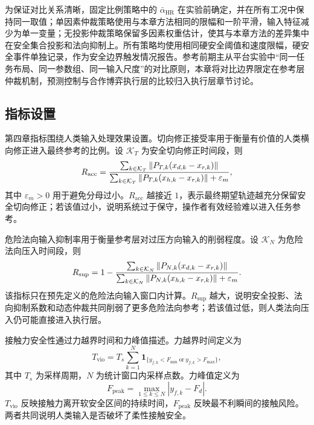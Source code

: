 为保证对比关系清晰，固定比例策略中的 $\bar\alpha_{\mathrm{HR}}$ 在实验前确定，并在所有工况中保持同一取值；单因素仲裁策略使用与本章方法相同的限幅和一阶平滑，输入特征减少为单一变量；无投影仲裁策略保留多因素权重估计，使其与本章方法的差异集中在安全集合投影和法向抑制上。所有策略均使用相同硬安全阈值和速度限幅，硬安全事件单独记录，作为安全边界触发情况报告。参考前期主从平台实验中“同一任务布局、同一参数组、同一输入尺度”的对比原则，本章将对比边界限定在参考层仲裁机制，预测控制与合作博弈执行层的比较归入执行层章节讨论。

\subsection{指标设置}
\label{subsec:ch4_metric_setting}

第四章指标围绕人类输入处理效果设置。切向修正接受率用于衡量有价值的人类横向修正进入最终参考的比例。设 $\mathcal K_T$ 为安全切向修正时间段，则
\begin{equation}
  R_{\mathrm{acc}}=
  \frac{
  \sum_{k\in\mathcal K_T}
  \left\lVert P_{T,k}(x_{d,k}-x_{r,k})\right\rVert}
  {
  \sum_{k\in\mathcal K_T}
  \left\lVert P_{T,k}(x_{h,k}-x_{r,k})\right\rVert+\varepsilon_m
  },
  \label{eq:ch4_metric_acceptance}
\end{equation}
其中 $\varepsilon_m>0$ 用于避免分母过小。$R_{\mathrm{acc}}$ 越接近 $1$，表示最终期望轨迹越充分保留安全切向修正；若该值过小，说明系统过于保守，操作者有效经验难以进入任务参考。

危险法向输入抑制率用于衡量参考层对过压方向输入的削弱程度。设 $\mathcal K_N$ 为危险法向压入时间段，则
\begin{equation}
  R_{\mathrm{sup}}=
  1-
  \frac{
  \sum_{k\in\mathcal K_N}
  \left\lVert P_{N,k}(x_{d,k}-x_{r,k})\right\rVert}
  {
  \sum_{k\in\mathcal K_N}
  \left\lVert P_{N,k}(x_{h,k}-x_{r,k})\right\rVert+\varepsilon_m
  } .
  \label{eq:ch4_metric_suppression}
\end{equation}
该指标只在预先定义的危险法向输入窗口内计算。$R_{\mathrm{sup}}$ 越大，说明安全投影、法向抑制系数和动态仲裁共同削弱了更多危险法向参考；若该值过低，则人类法向压入仍可能直接进入执行层。

接触力安全性通过力越界时间和力峰值描述。力越界时间定义为
\begin{equation}
  T_{\mathrm{vio}}=
  T_s\sum_{k=1}^{N}
  \mathbf{1}_{\{y_{f,k}<F_{\min}\ \mathrm{or}\ y_{f,k}>F_{\max}\}},
  \label{eq:ch4_metric_violation}
\end{equation}
其中 $T_s$ 为采样周期，$N$ 为统计窗口内采样点数。力峰值定义为
\begin{equation}
  F_{\mathrm{peak}}=
  \max_{1\le k\le N}|y_{f,k}-F_d|.
  \label{eq:ch4_metric_force_peak}
\end{equation}
$T_{\mathrm{vio}}$ 反映接触力离开软安全区间的持续时间，$F_{\mathrm{peak}}$ 反映最不利瞬间的接触风险。两者共同说明人类输入是否破坏了柔性接触安全。

